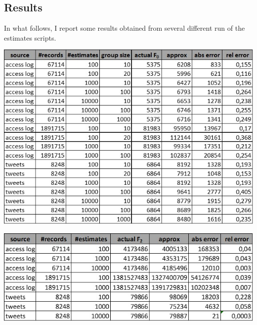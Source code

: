 \subsection{Results}

In what follows, I report some results obtained from several different run of the estimates scripts.

\begin{center}
	\includegraphics[scale=0.7,]{img/f0.jpg}
\end{center}

\bigskip
\begin{center}
	\includegraphics[scale=0.7]{img/f2.jpg}
\end{center}
